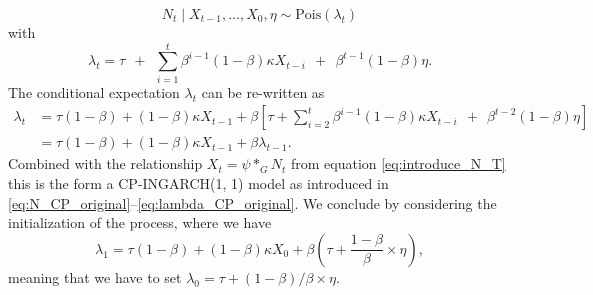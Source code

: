 \documentclass[review]{elsarticle}
\begin{document}
$$
N_t \mid X_{t - 1}, \dots, X_0, \eta \sim \text{Pois}(\lambda_t)
$$
with
$$
\lambda_t = \tau \ \ + \ \ \sum_{i = 1}^t \beta^{i - 1}(1 - \beta)\kappa X_{t - i} \ \ + \ \ \beta^{t - 1}(1 - \beta)\eta.
$$
The conditional expectation $\lambda_t$ can be re-written as
\begin{align*}
\lambda_t & = \tau(1 - \beta) + (1 - \beta)\kappa X_{t - 1} + \beta \left[\tau +   \sum_{i = 2}^t \beta^{i - 1}(1 - \beta)\kappa X_{t - i}  \ \ + \ \ \beta^{t - 2}(1 - \beta)\eta\right]\\
& = \tau(1 - \beta) + (1 - \beta)\kappa X_{t - 1} + \beta \lambda_{t - 1}.
\end{align*}
Combined with the relationship $X_t = \psi *_G N_t$ from equation \eqref{eq:introduce_N_T} this is the form a CP-INGARCH(1, 1) model as introduced in \eqref{eq:N_CP_original}--\eqref{eq:lambda_CP_original}. We conclude by considering the initialization of the process, where we have
$$
\lambda_1 = \tau(1 - \beta) + (1 - \beta)\kappa X_0 + \beta\left(\tau + \frac{1 - \beta}{\beta} \times \eta \right),
$$
meaning that we have to set $\lambda_0 = \tau + (1 - \beta)/\beta \times \eta$.

%
%
%


\end{document}
